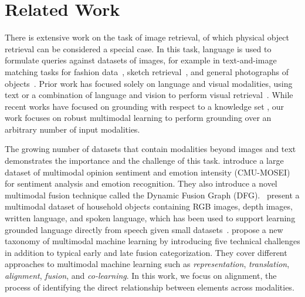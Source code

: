 \documentclass[10pt]{article} %
\newcommand{\todocmi}[1]{\todo[inline,color=green!40]{\small #1 -- Cynthia}}
\newcommand{\todoffinline}[1]{\todo[inline,color=blue!20]{\small #1 -- Frank}}
\begin{document}


\section{Related Work}
\label{sec:Related-Work}



There is extensive work on the task of image retrieval, of which physical object retrieval can be considered a special case. In this task, language is used to formulate queries against datasets of images, for example in text-and-image matching tasks for fashion data~\citep{gao2020fashionbert, wen2021comprehensive}, sketch retrieval~\citep{huang2017deep}, and general photographs of objects~\citep{ma2020large, novak2015large, hong2021gilbert}. Prior work has focused solely on language and visual modalities, using text or a combination of language and vision to perform visual retrieval~\citep{vo2019composing}. While recent works have focused on grounding with respect to a knowledge set \citep{10.1145/3357384.3357889,10.1145/3397271.3401097}, our work focuses on robust multimodal learning to perform grounding over an arbitrary number of input modalities. 

The growing number of datasets that contain modalities beyond images and text demonstrates the importance and the challenge of this task. \citet{bagher-zadeh-etal-2018-multimodal} introduce a large dataset of multimodal opinion sentiment and emotion intensity (CMU-MOSEI) for sentiment analysis and emotion recognition. They also introduce a novel multimodal fusion technique called the Dynamic Fusion Graph (DFG).~\citet{GoLD_UMBC} present a multimodal dataset of household objects containing RGB images, depth images, written language, and spoken language, which has been used to support learning grounded language directly from speech given small datasets~\citep{KebeAAAI2022}. 
\citet{baltrusaitisMultimodalMachineLearning2019} propose a new taxonomy of multimodal machine learning by introducing five technical challenges in addition to typical early and late fusion categorization. They cover different approaches to multimodal machine learning such as \textit{representation}, \textit{translation}, \textit{alignment}, \textit{fusion}, and \textit{co-learning}. In this work, we focus on alignment, the process of identifying the direct relationship between elements across modalities.
\end{document}
